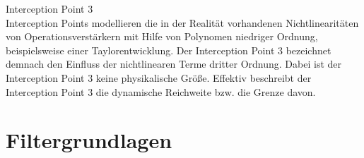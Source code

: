 \begin{description}
\item Interception Point 3 \\
Interception Points modellieren die in der Realität vorhandenen Nichtlinearitäten von Operationsverstärkern mit Hilfe von Polynomen niedriger Ordnung, beispielsweise einer Taylorentwicklung. Der Interception Point 3 bezeichnet demnach den Einfluss der nichtlinearen Terme dritter Ordnung. Dabei ist der Interception Point 3 keine physikalische Größe. Effektiv beschreibt der Interception Point 3 die dynamische Reichweite bzw. die Grenze davon. 
\end{description}

\section{Filtergrundlagen}

